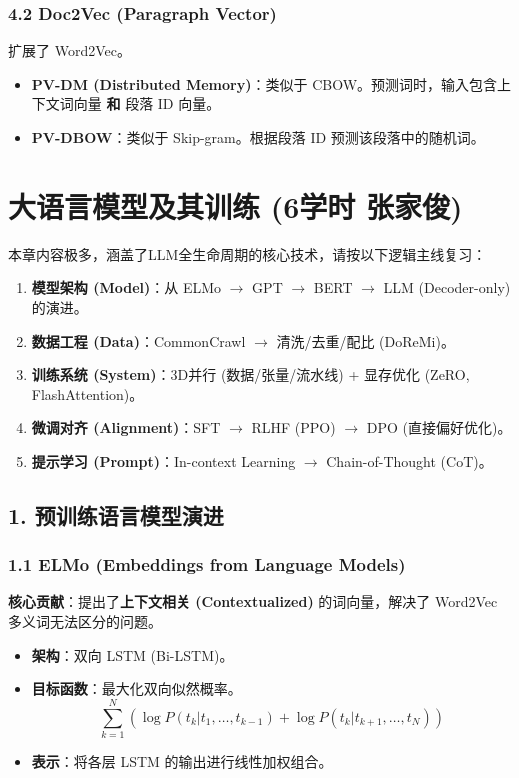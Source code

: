 \documentclass[a4paper, 11pt]{ctexart}
\begin{document}
\subsubsection{4.2 Doc2Vec (Paragraph Vector)}
扩展了 Word2Vec。
\begin{itemize}
    \item \textbf{PV-DM (Distributed Memory)}：类似于 CBOW。预测词时，输入包含上下文词向量 \textbf{和} 段落 ID 向量。
    \item \textbf{PV-DBOW}：类似于 Skip-gram。根据段落 ID 预测该段落中的随机词。
\end{itemize}
\newpage

\section{大语言模型及其训练 \small{(6学时 张家俊)}}

\begin{note}[本章知识图谱]
本章内容极多，涵盖了LLM全生命周期的核心技术，请按以下逻辑主线复习：
\begin{enumerate}
    \item \textbf{模型架构 (Model)}：从 ELMo $\to$ GPT $\to$ BERT $\to$ LLM (Decoder-only) 的演进。
    \item \textbf{数据工程 (Data)}：CommonCrawl $\to$ 清洗/去重/配比 (DoReMi)。
    \item \textbf{训练系统 (System)}：3D并行 (数据/张量/流水线) + 显存优化 (ZeRO, FlashAttention)。
    \item \textbf{微调对齐 (Alignment)}：SFT $\to$ RLHF (PPO) $\to$ DPO (直接偏好优化)。
    \item \textbf{提示学习 (Prompt)}：In-context Learning $\to$ Chain-of-Thought (CoT)。
\end{enumerate}
\end{note}

\subsection{1. 预训练语言模型演进}

\subsubsection{1.1 ELMo (Embeddings from Language Models)}
\textbf{核心贡献}：提出了\textbf{上下文相关 (Contextualized)} 的词向量，解决了 Word2Vec 多义词无法区分的问题。
\begin{itemize}
    \item \textbf{架构}：双向 LSTM (Bi-LSTM)。
    \item \textbf{目标函数}：最大化双向似然概率。
    $$ \sum_{k=1}^N (\log P(t_k | t_1, \dots, t_{k-1}) + \log P(t_k | t_{k+1}, \dots, t_N)) $$
    \item \textbf{表示}：将各层 LSTM 的输出进行线性加权组合。
\end{itemize}
\end{document}
